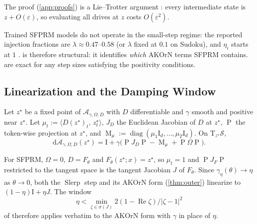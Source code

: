\documentclass{article}
\theoremstyle{plain}
\theoremstyle{definition}
\theoremstyle{remark}
\newcommand{\ip}[2]{\langle #1,\, #2\rangle}
\newcommand{\Proj}{\operatorname{P}}
\newcommand{\Slerp}{\operatorname{Slerp}}
\newcommand{\Id}{\mathrm{I}}
\newcommand{\diag}{\operatorname{diag}}
\newcommand{\tang}{\mathrm{T}}
\begin{document}
The proof (\cref{app:proofs}) is a Lie--Trotter argument \citep{trotter1959}: every intermediate state
is $z+O(\varepsilon)$, so evaluating all drives at $z$ costs $O(\varepsilon^2)$.

\begin{remark}[Scope]
\label{rem:scope}
Trained SFPRM models do not operate in the small-step regime: the reported injection fractions are
$\lambda\approx0.47$--$0.58$ (or $\lambda$ fixed at $0.1$ on Sudoku), and $\eta_i$ starts at $1$
\citep{sfprm}.  is therefore structural: it identifies \emph{which} AKOrN terms SFPRM
contains.  are exact for any step sizes satisfying the positivity
conditions.
\end{remark}

\subsection{Linearization and the Damping Window}
\label{sec:linearization}

\begin{proposition}
\label{prop:linearization}
Let $z^\star$ be a fixed point of $\mathcal A_{\gamma,\Omega,D}$ with $D$ differentiable and $\gamma$
smooth and positive near $z^\star$. Let $\mu_t:=\ip{D(z^\star)_t}{z^\star_t}$, $J_D$ the Euclidean
Jacobian of $D$ at $z^\star$, $\Proj$ the token-wise projection at $z^\star$, and
$\operatorname{M}_\mu:=\diag(\mu_1\Id_d,\dots,\mu_T\Id_d)$. On $\tang_{z^\star}\mathcal S$,
\begin{equation}
  \mathrm{d}\mathcal A_{\gamma,\Omega,D}(z^\star) = \Id + \gamma\big(\Proj J_D \Proj - \operatorname{M}_\mu + \Proj\Omega\Proj\big).
\end{equation}
\end{proposition}

\begin{corollary}
\label{cor:window}
For SFPRM, $\Omega=0$, $D=F_\theta$ and $F_\theta(z^\star;x)=z^\star$, so $\mu_t=1$ and
$\Proj J_F\Proj$ restricted to the tangent space is the tangent Jacobian $J$ of $F_\theta$. Since
$\gamma_\eta(\theta)\to\eta$ as $\theta\to0$, both the $\Slerp$ step and its AKOrN form
(\cref{thm:outer}) linearize to $(1-\eta)\Id+\eta J$. The window
\begin{equation}
  \eta<\min_{\zeta\in\sigma(J)} 2(1-\operatorname{Re}\zeta)/|\zeta-1|^2
\end{equation}
of \citet{sfprm} therefore applies verbatim to the AKOrN form with $\gamma$ in place of $\eta$.
\end{corollary}
\end{document}
